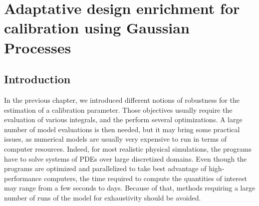 \documentclass[../../Main_ManuscritThese.tex]{subfiles}
\begin{document}
\chapter{Adaptative design enrichment for calibration using Gaussian Processes}
\label{chap:adaptative_design_gp}
\minitoc
\newpage
\subfileLocal{\pagestyle{contentStyle}}



\section{Introduction}

In the previous chapter, we introduced different notions of robustness for the estimation of a calibration parameter. Those objectives usually require the evaluation of various integrals, and the perform several optimizations. A large number of model evaluations is then needed, but it may bring some practical issues, as numerical models are usually very expensive to run in terms of computer resources. Indeed, for most realistic physical simulations, the programs have to solve systems of PDEs over large discretized domains. Even though the programs are optimized and parallelized to take best advantage of high-performance computers, the time required to compute the quantities of interest may range from a few seconds to days. Because of that, methods requiring a large number of runs of the model for exhaustivity should be avoided.


\end{document}
